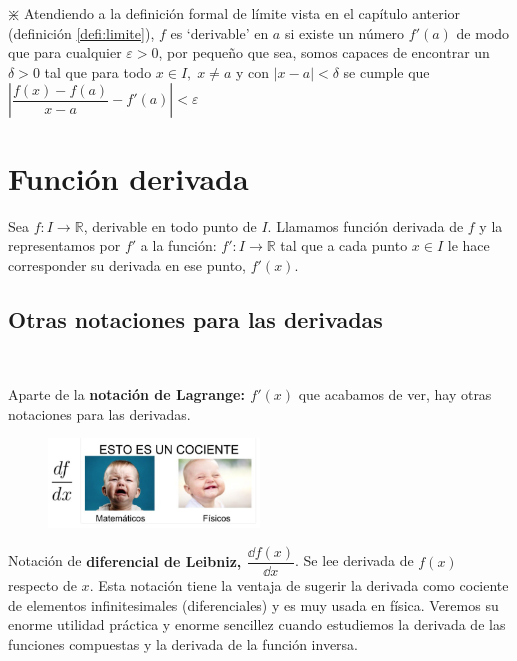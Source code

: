 	  $\divideontimes$ Atendiendo a la definición formal de límite vista en el capítulo anterior (definición \ref{defi:limite}), $f$ es `derivable' en $a$ si existe un número $f'(a)$ de modo que para cualquier $\varepsilon>0$, por pequeño que sea, somos capaces de encontrar un $\delta>0$ tal que para todo $x\in I, \; x\neq a$ y con $|x-a|<\delta$ se cumple que $\left|\dfrac {f(x)-f(a)}{x-a} - f'(a) \right|<\varepsilon$
	  
	  
	  \section{Función derivada}
	  
	  \begin{defi}
	  Sea $f:I\to \mathbb R$, derivable en todo punto de $I$. Llamamos función derivada de $f$ y la representamos por $f'$ a la función: $f':I\to \mathbb R$ tal que a cada punto $x\in I$ le hace corresponder su derivada en ese punto, $f'(x)$.	
	  \end{defi}
	  
	  \subsection{Otras notaciones para las derivadas}
	  
	   \begin{multicols}{2}
	   $\quad$
	   
	  Aparte de la \textbf{notación de Lagrange: $f'(x)$} que acabamos de ver, hay otras notaciones para las derivadas.
	  	\begin{figure}[H]
			\centering
			\includegraphics[width=0.5\textwidth]{imagenes/imagenes04/xiste04.png}
			\label{mates-fisics}
		\end{figure}
		\end{multicols}
	
	\vspace{-5mm}
	
	  Notación de \textbf{diferencial de Leibniz, $\dfrac {\dd f(x)}{\dd x} $}. Se lee derivada de $f(x)$ respecto de $x$. Esta notación tiene la ventaja de sugerir la derivada como cociente de elementos infinitesimales (diferenciales) y es muy usada en física. Veremos su enorme utilidad práctica y enorme sencillez cuando estudiemos la derivada de las funciones compuestas y la derivada de la función inversa.
	  
